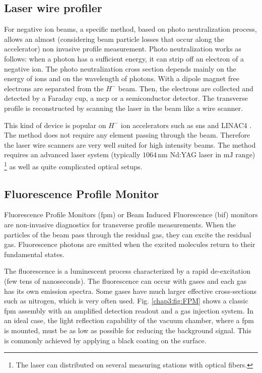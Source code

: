 \begin{refsection}
  \subsection{Laser wire profiler}
  For negative ion beams, a specific method, based on photo neutralization process, allows an almost (considering beam particle losses that occur along the accelerator) non invasive profile measurement. Photo neutralization works as follows: when a photon has a sufficient energy, it can strip off an electron of a negative ion.
  The photo neutralization cross section depends mainly on the energy of ions and on the wavelength of photons. With a dipole magnet free electrons are separated from the $H^-$ beam. Then, the electrons are collected and detected by a Faraday cup, a \acrshort{mcp} or a semiconductor detector. The transverse profile is reconstructed by scanning the laser in the beam like a wire scanner.

  This kind of device is popular on $H^-$ ion accelerators such as \acrshort{sns} \cite{LIU2010241} and LINAC4 \cite{Hofmann2015}. The method does not require any element passing through the beam. Therefore the laser wire scanners are very well suited for high intensity beams. The method requires an advanced laser system (typically $1064\,\mathrm{nm}$ Nd:YAG laser in $\mathrm{mJ}$ range) \footnote{The laser can distributed on several measuring stations with optical fibers.} as well as quite complicated optical setups.

  \subsection{Fluorescence Profile Monitor}
  Fluorescence Profile Monitors (\acrshort{fpm}) or Beam Induced Fluorescence (\acrshort{bif}) monitors are non-invasive diagnostics for transverse profile measurements. When the particles of the beam pass through the residual gas, they can excite the residual gas. Fluorescence photons are emitted when the excited molecules return to their fundamental states.

  The fluorescence is a luminescent process characterized by a rapid de-excitation (few tens of nanoseconds). The fluorescence can occur with gases and each gas has its own emission spectra. Some gases have much larger effective cross-sections such as nitrogen, which is very often used. Fig. \ref{chap3:fig:FPM} shows a classic \acrshort{fpm} assembly with an amplified detection readout and a gas injection system. In an ideal case, the light reflection capability of the vacuum chamber, where a \acrshort{fpm} is mounted, must be as low as possible for reducing the background signal. This is commonly achieved by applying a black coating on the surface.


\end{refsection}
